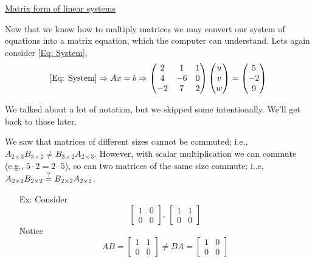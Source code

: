 \documentclass[reqno]{amsart}
\theoremstyle{definition}
\begin{document}
\bigskip

\underline{Matrix form of linear systems}

Now that we know how to multiply matrices we may convert our system of equations into 
a matrix equation, which the computer can understand.  Lets again consider \eqref{Eq: System},
%
\begin{equation}
\eqref{Eq: System} \Rightarrow Ax = b \Rightarrow \begin{pmatrix}
2 & 1 & 1\\
4 & -6 & 0\\
-2 & 7 & 2
\end{pmatrix}\begin{pmatrix}
u\\
v\\
w
\end{pmatrix} = \begin{pmatrix}
5\\
-2\\
9
\end{pmatrix}
\end{equation}

\bigskip
\bigskip

We talked about a lot of notation, but we skipped some intentionally.  We'll get back to those later.

We saw that matrices of different sizes cannot be commuted; i.e., 
$A_{2\times 3}B_{3\times 2} \neq B_{3\times 2}A_{2\times 3}$.  However, with scalar multiplication
we can commute (e.g., $5\cdot 2 = 2\cdot 5$), so can two matrices of the same size commute; i..e,
$A_{2\times 2}B_{2\times 2} \stackrel{?}{=}  B_{2\times 2}A_{2\times 2}$.

\pagebreak

\begin{itemize}

\item[Ex:  ]  Consider
%
\begin{equation*}
\begin{bmatrix}
1 & 0\\
0 & 0
\end{bmatrix},\, \begin{bmatrix}
1 & 1\\
0 & 0
\end{bmatrix}
\end{equation*}
%
Notice
%
\begin{equation*}
AB = \begin{bmatrix}
1 & 1\\
0 & 0
\end{bmatrix} \neq BA = \begin{bmatrix}
1 & 0\\
0 & 0
\end{bmatrix}
\end{equation*}

\end{itemize}
\end{document}
